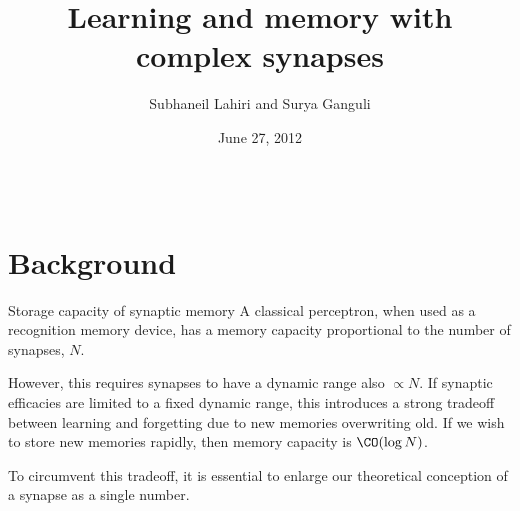 \documentclass[final,hyperref={pdfpagelabels=false,bookmarks=false}]{beamer}
\title{Learning and memory with complex synapses}
\author{Subhaneil Lahiri and Surya Ganguli}
\institute[Stanford]{%
Department of Applied Physics, Stanford University, Stanford CA
}
\date{June 27, 2012}
\begin{document}
\begin{frame}{}

\begin{columns}[t]


\begin{column}{0.27\linewidth}

\section{Background}


\begin{block}{Storage capacity of synaptic memory}
%
%
 A classical perceptron, when used as a recognition memory device, has a memory capacity proportional to the number of synapses, $N$.

 \vp However, this requires synapses to have a dynamic range also $\propto N$.
 If synaptic efficacies are limited to a fixed dynamic range, this introduces a strong tradeoff between learning and forgetting due to new memories overwriting old.
 If we wish to store new memories rapidly, then memory capacity is $\CO(\log N)$.
 \\ 

 \vp To circumvent this tradeoff, it is essential to enlarge our theoretical conception of a synapse as a single number.
\end{block}



\end{column}
\end{columns}
\end{frame}
\end{document}
